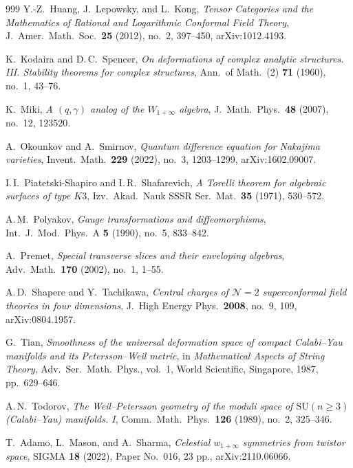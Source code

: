\documentclass[11pt]{memoir}
\begin{document}
\begin{thebibliography}{999}
Y.-Z.~Huang, J.~Lepowsky, and L.~Kong, \emph{Tensor Categories and the Mathematics of Rational and Logarithmic Conformal Field Theory}, J.\ Amer.\ Math.\ Soc.\ \textbf{25} (2012), no.~2, 397--450, arXiv:1012.4193.

K.~Kodaira and D.\,C.~Spencer, \emph{On deformations of complex analytic structures. III. Stability theorems for complex structures}, Ann.\ of Math.\ (2) \textbf{71} (1960), no.~1, 43--76.

K.~Miki, \emph{A $(q,\gamma)$ analog of the $W_{1+\infty}$ algebra}, J.\ Math.\ Phys.\ \textbf{48} (2007), no.~12, 123520.

A.~Okounkov and A.~Smirnov, \emph{Quantum difference equation for Nakajima varieties}, Invent.\ Math.\ \textbf{229} (2022), no.~3, 1203--1299, arXiv:1602.09007.

I.\,I.~Piatetski-Shapiro and I.\,R.~Shafarevich, \emph{A Torelli theorem for algebraic surfaces of type $K3$}, Izv.\ Akad.\ Nauk SSSR Ser.\ Mat.\ \textbf{35} (1971), 530--572.

A.\,M.~Polyakov, \emph{Gauge transformations and diffeomorphisms}, Int.\ J.\ Mod.\ Phys.\ A \textbf{5} (1990), no.~5, 833--842.

A.~Premet, \emph{Special transverse slices and their enveloping algebras}, Adv.\ Math.\ \textbf{170} (2002), no.~1, 1--55.

A.\,D.~Shapere and Y.~Tachikawa, \emph{Central charges of $\mathcal N=2$ superconformal field theories in four dimensions}, J.\ High Energy Phys.\ \textbf{2008}, no.~9, 109, arXiv:0804.1957.

G.~Tian, \emph{Smoothness of the universal deformation space of compact Calabi--Yau manifolds and its Petersson--Weil metric}, in \emph{Mathematical Aspects of String Theory}, Adv.\ Ser.\ Math.\ Phys., vol.~1, World Scientific, Singapore, 1987, pp.~629--646.

A.\,N.~Todorov, \emph{The Weil--Petersson geometry of the moduli space of $\mathrm{SU}(n \geq 3)$ (Calabi--Yau) manifolds. I}, Comm.\ Math.\ Phys.\ \textbf{126} (1989), no.~2, 325--346.

T.~Adamo, L.~Mason, and A.~Sharma, \emph{Celestial $w_{1+\infty}$ symmetries from twistor space}, SIGMA \textbf{18} (2022), Paper No.~016, 23 pp., arXiv:2110.06066.


\end{thebibliography}
\end{document}
